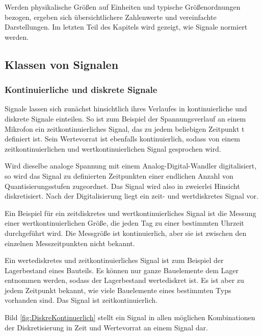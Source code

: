 \noindent Werden physikalische Gr\"{o}{\ss}en auf Einheiten und typische Gr\"{o}{\ss}enordnungen bezogen, ergeben sich \"{u}bersichtlichere Zahlenwerte und vereinfachte Darstellungen. Im letzten Teil des Kapitels wird gezeigt, wie Signale normiert werden. 

\subsection{Klassen von Signalen}

\subsubsection{ Kontinuierliche und diskrete Signale}
Signale lassen sich zun\"{a}chst hinsichtlich ihres Verlaufes in kontinuierliche und diskrete Signale einteilen. So ist zum Beispiel der Spannungsverlauf an einem Mikrofon ein zeitkontinuierliches Signal, das zu jedem beliebigen Zeitpunkt t definiert ist. Sein Wertevorrat ist ebenfalls kontinuierlich, sodass von einem zeitkontinuierlichen und wertkontinuierlichen Signal gesprochen wird.\newline

\noindent Wird dieselbe analoge Spannung mit einem Analog-Digital-Wandler digitalisiert, so wird das Signal zu definierten Zeitpunkten einer endlichen Anzahl von Quantisierungsstufen zugeordnet. Das Signal wird also in zweierlei Hinsicht diskretisiert. Nach der Digitalisierung liegt ein zeit- und wertdiskretes Signal vor.\newline

\noindent Ein Beispiel f\"{u}r ein zeitdiskretes und wertkontinuierliches Signal ist die Messung einer wertkontinuierlichen Gr\"{o}{\ss}e, die jeden Tag zu einer bestimmten Uhrzeit durchgef\"{u}hrt wird. Die Messgr\"{o}{\ss}e ist kontinuierlich, aber sie ist zwischen den einzelnen Messzeitpunkten nicht bekannt.\newline

\noindent Ein wertediskretes und zeitkontinuierliches Signal ist zum Beispiel der Lagerbestand eines Bauteils. Es k\"{o}nnen nur ganze Bauelemente dem Lager entnommen werden, sodass der Lagerbestand wertediskret ist. Es ist aber zu jedem Zeitpunkt bekannt, wie viele Bauelemente eines bestimmten Typs vorhanden sind. Das Signal ist zeitkontinuierlich.\newline

\noindent Bild \ref{fig:DiskreKontinuerlich} stellt ein Signal in allen m\"{o}glichen Kombinationen der Diskretisierung in Zeit und Wertevorrat an einem Signal dar. 

